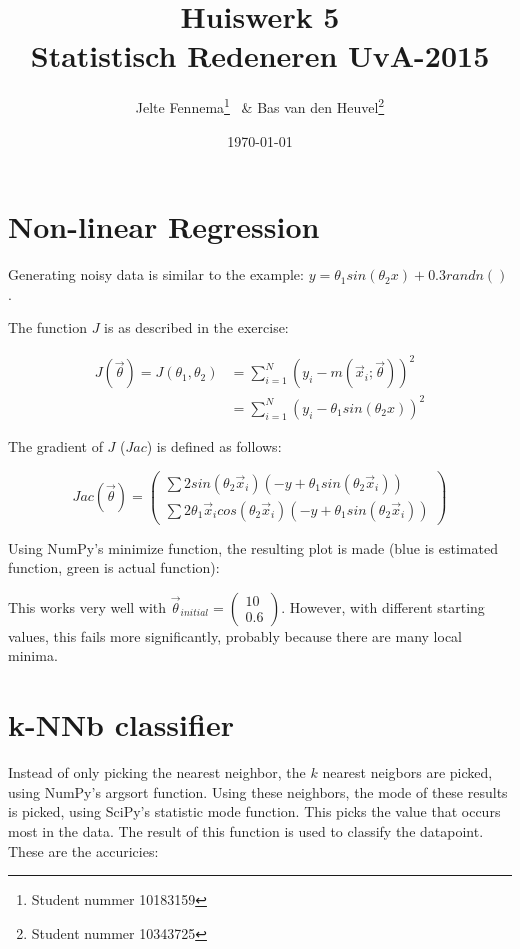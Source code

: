 \documentclass{article}
\title{Huiswerk 5\\ \large{Statistisch Redeneren UvA-2015}}
\author{Jelte Fennema\thanks{Student nummer 10183159} ~\& Bas van den
Heuvel\thanks{Student nummer 10343725}}
\date{\today}
\begin{document}
\maketitle

\section{Non-linear Regression}
Generating noisy data is similar to the example: $y = \theta_1 sin(\theta_2 x) +
0.3 randn()$.

The function $J$ is as described in the exercise:

\begin{align*}
    J(\vec \theta) = J(\theta_1, \theta_2) &= \sum_{i=1}^N (y_i - m(\vec x_i; \vec
    \theta))^2 \\
    &= \sum_{i=1}^N (y_i - \theta_1 sin(\theta_2 x))^2
\end{align*}

The gradient of $J$ ($Jac$) is defined as follows:

$$ Jac(\vec \theta) = \left(\begin{matrix}\sum 2 sin(\theta_2 \vec x_i) (-y +
\theta_1 sin(\theta_2 \vec x_i)) \\ \sum 2 \theta_1 \vec x_i cos(\theta_2 \vec
x_i) (-y + \theta_1 sin(\theta_2 \vec x_i)) \end{matrix} \right) $$

Using NumPy's minimize function, the resulting plot is made (blue is estimated
function, green is actual function):



This works very well with $\vec \theta_{initial} = \left(\begin{matrix}10 \\
0.6\end{matrix}\right)$. However, with different starting values, this fails
more significantly, probably because there are many local minima.

\section{k-NNb classifier}

Instead of only picking the nearest neighbor, the $k$ nearest neigbors are
picked, using NumPy's argsort function. Using these neighbors, the mode of these
results is picked, using SciPy's statistic mode function. This picks the value
that occurs most in the data. The result of this function is used to classify
the datapoint. These are the accuricies:
\end{document}
